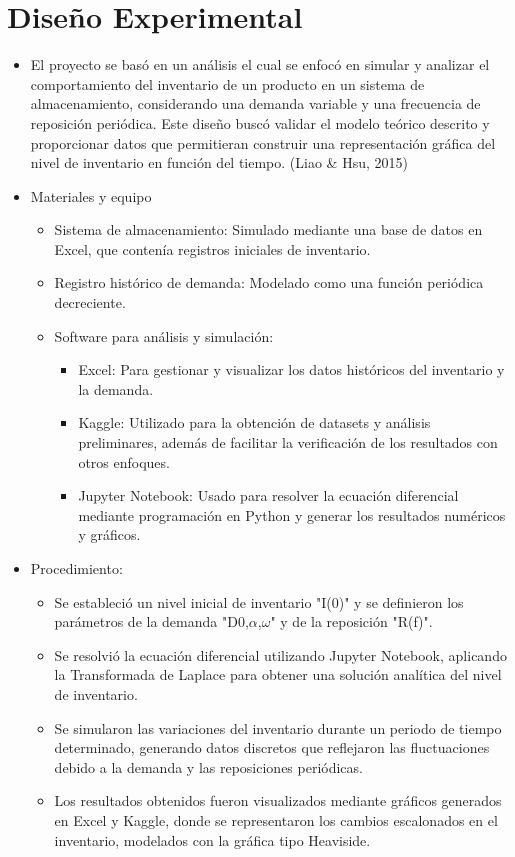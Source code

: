 \documentclass[12pt]{article}
\begin{document}
\section*{Diseño Experimental}
\begin{itemize}
    \item El proyecto se basó en un análisis el cual se enfocó en simular y analizar el comportamiento del inventario de un producto en un sistema de almacenamiento, considerando una demanda variable y una frecuencia de reposición periódica. Este diseño buscó validar el modelo teórico descrito y proporcionar datos que permitieran construir una representación gráfica del nivel de inventario en función del tiempo. (Liao \& Hsu, 2015)
    
    \item Materiales y equipo
    \begin{itemize}
        \item Sistema de almacenamiento: Simulado mediante una base de datos en Excel, que contenía registros iniciales de inventario.
        \item Registro histórico de demanda: Modelado como una función periódica decreciente.
        \item Software para análisis y simulación:
        \begin{itemize}
            \item Excel: Para gestionar y visualizar los datos históricos del inventario y la demanda.
            \item Kaggle: Utilizado para la obtención de datasets y análisis preliminares, además de facilitar la verificación de los resultados con otros enfoques.
            \item Jupyter Notebook: Usado para resolver la ecuación diferencial mediante programación en Python y generar los resultados numéricos y gráficos.
        \end{itemize}
    \end{itemize}
    
    \item Procedimiento:
    \begin{itemize}
        \item Se estableció un nivel inicial de inventario "I(0)" y se definieron los parámetros de la demanda "D0,$\alpha$,$\omega$" y de la reposición "R(f)".
        \item Se resolvió la ecuación diferencial utilizando Jupyter Notebook, aplicando la Transformada de Laplace para obtener una solución analítica del nivel de inventario.
        \item Se simularon las variaciones del inventario durante un periodo de tiempo determinado, generando datos discretos que reflejaron las fluctuaciones debido a la demanda y las reposiciones periódicas.
        \item Los resultados obtenidos fueron visualizados mediante gráficos generados en Excel y Kaggle, donde se representaron los cambios escalonados en el inventario, modelados con la gráfica tipo Heaviside.
    \end{itemize}
\end{itemize}
\end{document}
